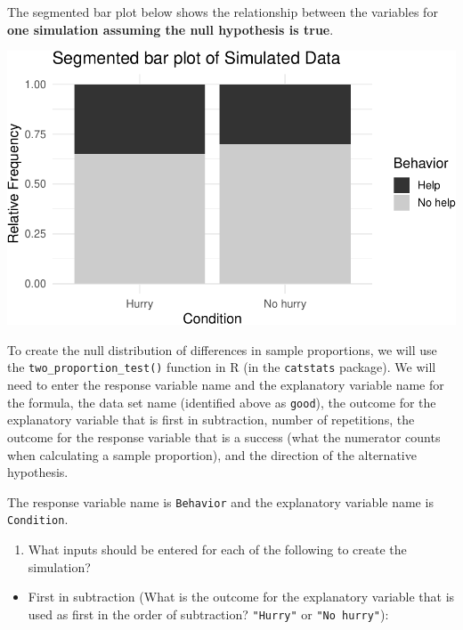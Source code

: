\documentclass[
]{report}
\providecommand{\tightlist}{%
  \setlength{\itemsep}{0pt}\setlength{\parskip}{0pt}}
\begin{document}
The segmented bar plot below shows the relationship between the variables for \textbf{one simulation assuming the null hypothesis is true}.

\begin{center}\includegraphics[width=0.6\linewidth]{08-A18-inference-2cat-simulationtest_files/figure-latex/unnamed-chunk-4-1} \end{center}

\newpage

To create the null distribution of differences in sample proportions, we will use the \texttt{two\_proportion\_test()} function in R (in the \texttt{catstats} package). We will need to enter the response variable name and the explanatory variable name for the formula, the data set name (identified above as \texttt{good}), the outcome for the explanatory variable that is first in subtraction, number of repetitions, the outcome for the response variable that is a success (what the numerator counts when calculating a sample proportion), and the direction of the alternative hypothesis.

The response variable name is \texttt{Behavior} and the explanatory variable name is \texttt{Condition}.

\begin{enumerate}
\def\labelenumi{\arabic{enumi}.}
\setcounter{enumi}{7}
\tightlist
\item
  What inputs should be entered for each of the following to create the simulation?
  \vspace{1mm}
\end{enumerate}

\begin{itemize}
\tightlist
\item
  First in subtraction (What is the outcome for the explanatory variable that is used as first in the order of subtraction? \texttt{"Hurry"} or \texttt{"No\ hurry"}):
\end{itemize}

\vspace{.15in}
\end{document}

